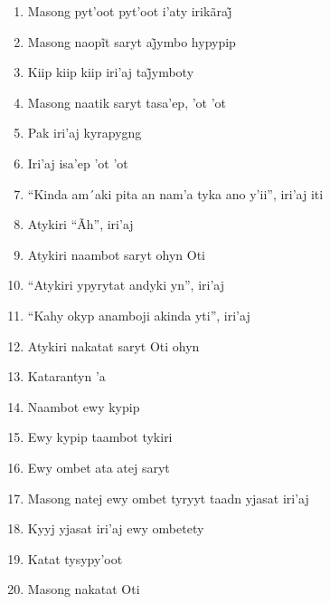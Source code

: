 \begin{enumerate}
 \item Masong pyt’oot pyt’oot i’aty irikãraj̃

 \item Masong naopĩt saryt aj̃ymbo hypypip

 \item Kiip kiip kiip iri’aj taj̃ymboty

 \item Masong naatik saryt tasa'ep, 'ot 'ot

 \item Pak iri'aj kyrapygng

 \item Iri'aj isa'ep 'ot 'ot

 \item ``Kinda am´aki pita an nam'a tyka ano y'ii'', iri'aj iti

 \item Atykiri ``Ãh'', iri'aj

 \begin{center}\end{center}

 \item Atykiri naambot saryt ohyn Oti

 \item ``Atykiri ypyrytat andyki yn'', iri'aj

 \item ``Kahy okyp anamboji akinda yti'', iri'aj

 \item Atykiri nakatat saryt Oti ohyn

 \item Katarantyn 'a

 \item Naambot ewy kypip

 \item Ewy kypip taambot tykiri

 \item Ewy ombet ata atej saryt

 \item Masong natej ewy ombet tyryyt taadn yjasat iri'aj

 \item Kyyj yjasat iri'aj ewy ombetety

 \item Katat tysypy'oot

 \begin{center}\end{center}

 \item Masong nakatat Oti


\end{enumerate}
